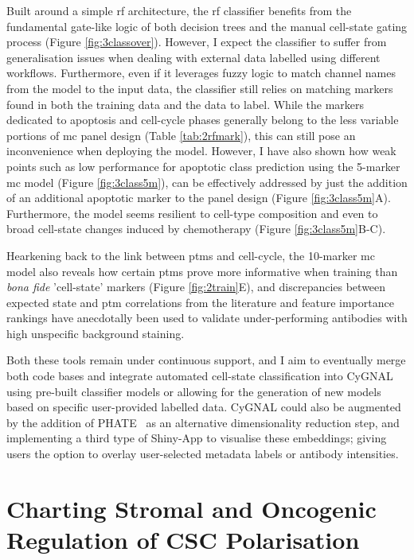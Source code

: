 Built around a simple \acrfull{rf} architecture, the \acrshort{rf} classifier benefits from the fundamental gate-like logic of both decision trees and the manual cell-state gating process (Figure \ref{fig:3classover}). However, I expect the classifier to suffer from generalisation issues when dealing with external data labelled using different workflows. Furthermore, even if it leverages fuzzy logic to match channel names from the model to the input data, the classifier still relies on matching markers found in both the training data and the data to label. While the markers dedicated to apoptosis and cell-cycle phases generally belong to the less variable portions of \acrshort{mc} panel design (Table \ref{tab:2rfmark}), this can still pose an inconvenience when deploying the model. However, I have also shown how weak points such as low performance for apoptotic class prediction using the 5-marker \acrshort{mc} model (Figure \ref{fig:3class5m}), can be effectively addressed by just the addition of an additional apoptotic marker to the panel design (Figure \ref{fig:3class5m}A). Furthermore, the model seems resilient to cell-type composition and even to broad cell-state changes induced by chemotherapy (Figure \ref{fig:3class5m}B-C).

Hearkening back to the link between \acrshort{ptm}s and cell-cycle, the 10-marker \acrshort{mc} model also reveals how certain \acrshort{ptm}s prove more informative when training than \emph{bona fide} 'cell-state' markers (Figure \ref{fig:2train}E), and discrepancies between expected state and \acrshort{ptm} correlations from the literature and feature importance rankings have anecdotally been used to validate under-performing antibodies with high unspecific background staining.

Both these tools remain under continuous support, and I aim to eventually merge both code bases and integrate automated cell-state classification into CyGNAL using pre-built classifier models or allowing for the generation of new models based on specific user-provided labelled data.
CyGNAL could also be augmented by the addition of PHATE~\cite{moon_visualizing_2019} as an alternative dimensionality reduction step, and implementing a third type of Shiny-App to visualise these embeddings; giving users the option to overlay user-selected metadata labels or antibody intensities.


\section{Charting Stromal and Oncogenic Regulation of CSC Polarisation}

